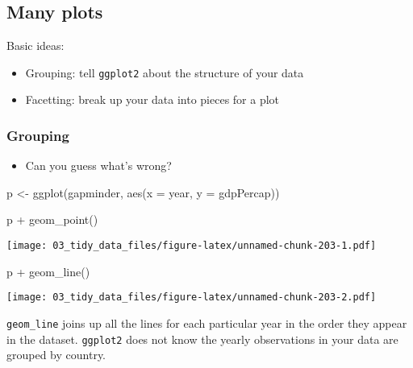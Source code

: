 \documentclass[
]{book}
\newenvironment{Shaded}{\begin{snugshade}}{\end{snugshade}}
\newcommand{\AttributeTok}[1]{\textcolor[rgb]{0.77,0.63,0.00}{#1}}
\newcommand{\FunctionTok}[1]{\textcolor[rgb]{0.00,0.00,0.00}{#1}}
\newcommand{\NormalTok}[1]{#1}
\newcommand{\OtherTok}[1]{\textcolor[rgb]{0.56,0.35,0.01}{#1}}
\newcommand{\SpecialCharTok}[1]{\textcolor[rgb]{0.00,0.00,0.00}{#1}}
\providecommand{\tightlist}{%
  \setlength{\itemsep}{0pt}\setlength{\parskip}{0pt}}
\begin{document}
\hypertarget{many-plots}{%
\subsection{Many plots}\label{many-plots}}

Basic ideas:

\begin{itemize}
\tightlist
\item
  Grouping: tell \texttt{ggplot2} about the structure of your data
\item
  Facetting: break up your data into pieces for a plot
\end{itemize}

\hypertarget{grouping-1}{%
\subsubsection{Grouping}\label{grouping-1}}

\begin{itemize}
\tightlist
\item
  Can you guess what's wrong?
\end{itemize}

\begin{Shaded}
\begin{Highlighting}[]
\NormalTok{p }\OtherTok{\textless{}{-}} \FunctionTok{ggplot}\NormalTok{(gapminder, }\FunctionTok{aes}\NormalTok{(}\AttributeTok{x =}\NormalTok{ year, }\AttributeTok{y =}\NormalTok{ gdpPercap))}

\NormalTok{p }\SpecialCharTok{+} \FunctionTok{geom\_point}\NormalTok{()}
\end{Highlighting}
\end{Shaded}

\texttt{[image: 03\_tidy\_data\_files/figure-latex/unnamed-chunk-203-1.pdf]}

\begin{Shaded}
\begin{Highlighting}[]
\NormalTok{p }\SpecialCharTok{+} \FunctionTok{geom\_line}\NormalTok{()}
\end{Highlighting}
\end{Shaded}

\texttt{[image: 03\_tidy\_data\_files/figure-latex/unnamed-chunk-203-2.pdf]}

\texttt{geom\_line} joins up all the lines for each particular year in the order they appear in the dataset. \texttt{ggplot2} does not know the yearly observations in your data are grouped by country.
\end{document}
